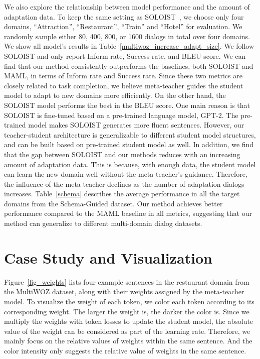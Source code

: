 \documentclass[letterpaper]{article} %
\begin{document}
We also explore the relationship between model performance and the amount of adaptation data. To keep the same setting as SOLOIST~\citep{Peng2020SOLOISTFT}, we choose only four domains, ``Attraction'', ``Restaurant'', ``Train'' and ``Hotel'' for evaluation. We randomly sample either 80, 400, 800, or 1600 dialogs in total over four domains. We show all model's results in Table~\ref{multiwoz_increase_adapt_size}. We follow SOLOIST and only report Inform rate, Success rate, and BLEU score.
We can find that our method consistently outperforms the baselines, both SOLOIST and MAML, in terms of Inform rate and Success rate. Since these two metrics are closely related to task completion, we believe meta-teacher guides the student model to adapt to new domains more efficiently.
On the other hand, the SOLOIST model performs the best in the BLEU score. One main reason is that SOLOIST is fine-tuned based on a pre-trained language model, GPT-2. The pre-trained model makes SOLOIST generates more fluent sentences. However, our teacher-student architecture is generalizable to different student model structures, and can be built based on pre-trained student model as well.
In addition, we find that the gap between SOLOIST and our methods reduces with an increasing amount of adaptation data. This is because, with enough data, the student model can learn the new domain well without the meta-teacher's guidance. Therefore, the influence of the meta-teacher declines as the number of adaptation dialogs increases.  Table~\ref{schema} describes the average performance in all the target domains from the Schema-Guided dataset. Our method achieves better performance compared to the MAML baseline in all metrics, suggesting that our method can generalize to different multi-domain dialog datasets.






\vspace{-1.58mm}
\section*{Case Study and Visualization}
\vspace{-1.69mm}
\vspace{-0.75mm}
\vspace{-0.84mm}
\vspace{-1.49mm}
Figure~\ref{fig_weights} lists four example sentences in the restaurant domain from  the MultiWOZ dataset, along with their weights assigned by the meta-teacher model.
To visualize the weight of each token, we color each token according to its corresponding weight.
The larger the weight is, the darker the color is.
Since we multiply the weights with token losses to update the student model, the absolute value of the weight can be considered as part of the learning rate.
Therefore, we mainly focus on the relative values of weights within the same sentence.
And the color intensity only suggests the relative value of weights in the same sentence.
\end{document}

